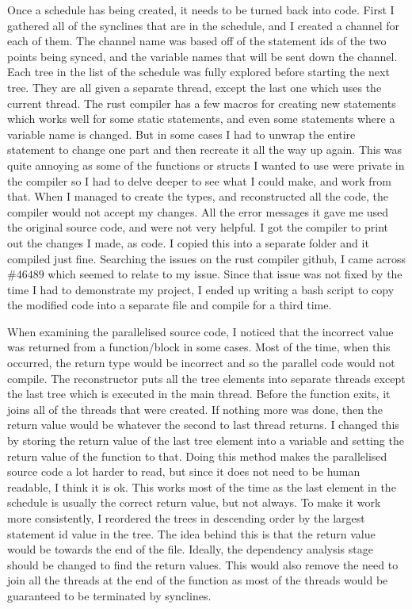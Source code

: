 Once a schedule has being created, it needs to be turned back into code. First I gathered all of the synclines that are in the schedule, and I created a channel for each of them. The channel name was based off of the statement ids of the two points being synced, and the variable names that will be sent down the channel. Each tree in the list of the schedule was fully explored before starting the next tree. They are all given a separate thread, except the last one which uses the current thread. The rust compiler has a few macros for creating new statements which works well for some static statements, and even some statements where a variable name is changed. But in some cases I had to unwrap the entire statement to change one part and then recreate it all the way up again. This was quite annoying as some of the functions or structs I wanted to use were private in the compiler so I had to delve deeper to see what I could make, and work from that. When I managed to create the types, and reconstructed all the code, the compiler would not accept my changes. All the error messages it gave me used the original source code, and were not very helpful. I got the compiler to print out the changes I made, as code. I copied this into a separate folder and it compiled just fine. Searching the issues on the rust compiler github, I came across \href{https://github.com/rust-lang/rust/issues/46489}{$\#46489$} which seemed to relate to my issue. Since that issue was not fixed by the time I had to demonstrate my project, I ended up writing a bash script to copy the modified code into a separate file and compile for a third time.

When examining the parallelised source code, I noticed that the incorrect value was returned from a function/block in some cases. Most of the time, when this occurred, the return type would be incorrect and so the parallel code would not compile. The reconstructor puts all the tree elements into separate threads except the last tree which is executed in the main thread. Before the function exits, it joins all of the threads that were created. If nothing more was done, then the return value would be whatever the second to last thread returns. I changed this by storing the return value of the last tree element into a variable and setting the return value of the function to that. Doing this method makes the parallelised source code a lot harder to read, but since it does not need to be human readable, I think it is ok. This works most of the time as the last element in the schedule is usually the correct return value, but not always. To make it work more consistently, I reordered the trees in descending order by the largest statement id value in the tree. The idea behind this is that the return value would be towards the end of the file. Ideally, the dependency analysis stage should be changed to find the return values. This would also remove the need to join all the threads at the end of the function as most of the threads would be guaranteed to be terminated by synclines.

